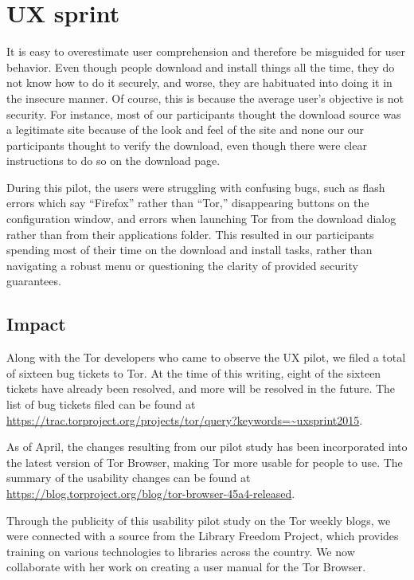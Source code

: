 \documentclass[letterpaper,twocolumn,11pt]{article}
\begin{document}
\section{UX sprint}  %
\indent {}

It is easy to overestimate user comprehension and therefore be 
misguided for user behavior. Even though people download and install things all the time, 
they do not know how to do it securely, and worse, they are habituated into doing it in the 
insecure manner. Of course, this is because the average user's objective is not security. 
For instance, most of our participants thought the download source was a legitimate site because
of the look and feel of the site and none our our participants thought to verify the download, 
even though there were clear instructions to do so on the download page. 

During this pilot, the users were struggling with confusing bugs, such as flash errors which
say ``Firefox'' rather than ``Tor,'' disappearing buttons on the configuration window, and errors when
launching Tor from the download dialog rather than from their applications folder. This resulted in our 
participants spending most of their time on the download and install tasks, rather than 
navigating a robust menu or questioning the clarity of provided security guarantees. 

\subsection{Impact}
\indent \indent Along with the Tor developers who came to observe the UX pilot, we filed 
a total of sixteen bug tickets to Tor. At the time of  this writing, eight of the sixteen tickets 
have already been resolved, and more will be resolved in the future.  The list of bug
tickets filed can be found at \url{https://trac.torproject.org/projects/tor/query?keywords=~uxsprint2015}. 

As of April, the changes resulting from our pilot study has been incorporated into the latest 
version of Tor Browser, making Tor more usable for people to use. 
The summary of the usability changes can be found at \url{https://blog.torproject.org/blog/tor-browser-45a4-released}. 

Through the publicity of this usability pilot study on the Tor weekly blogs, we were connected
with a source from the Library Freedom Project, which provides training on various technologies 
to libraries across the country. We now collaborate with her work on creating a user manual
for the Tor Browser. 
\end{document}
